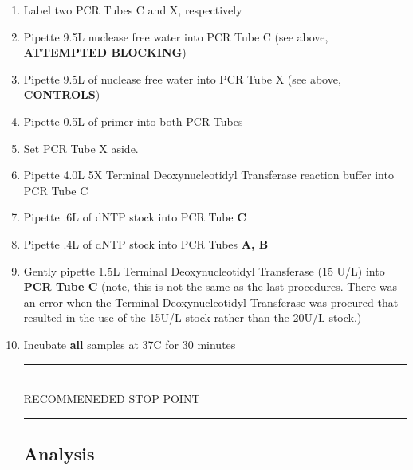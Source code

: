 \documentclass[letterpaper]{article}
\newcommand{\tdt}{Terminal Deoxynucleotidyl Transferase}
\newcommand{\C}{\degree{}C}
\newcommand{\uL}{\micro{}L}
\newcommand{\RstopPoint}{\begin{center}
\rule{0.5\textwidth}{.4mm}\\
\vspace{1mm} 
RECOMMENEDED STOP POINT\\
\rule{0.5\textwidth}{.4mm}
\end{center}}
\begin{document}
\begin{enumerate}
\subsection{Extending}
Based off of our standard \tdt{} extending procedure \cite{genTdT}.
\item{Label two PCR Tubes C and X, respectively}
\item{Pipette 9.5\uL{} nuclease free water into PCR Tube C (see above, \textbf{ATTEMPTED BLOCKING})}
\item{Pipette 9.5\uL{} of nuclease free water into PCR Tube X (see above, \textbf{CONTROLS})}
\item{Pipette 0.5\uL{} of primer into both PCR Tubes}
\item{Set PCR Tube X aside.}
\item{Pipette 4.0\uL{} 5X \tdt{} reaction buffer into PCR Tube C}
\item{Pipette .6\uL{} of dNTP stock into PCR Tube \textbf{C}}
\item{Pipette .4\uL{} of dNTP stock into PCR Tubes \textbf{A, B}}
\item{Gently pipette 1.5\uL{} \tdt{} (15 U/\uL{}) into \textbf{PCR Tube C} (note, this is not the same as the last procedures. There was an error when the \tdt{} was procured that resulted in the use of the 15U/\uL{} stock rather than the 20U/\uL{} stock.)}
\item{Incubate \textbf{all} samples at 37\C{} for 30 minutes}\\
\RstopPoint{} 
\subsection{Analysis}

\end{enumerate}
\end{document}
